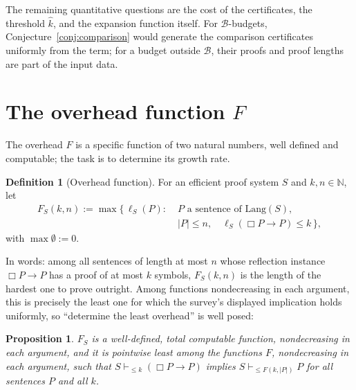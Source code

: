 \documentclass[11pt]{amsart}
\theoremstyle{plain}
\newtheorem{proposition}[theorem]{Proposition}
\theoremstyle{definition}
\newtheorem{definition}[theorem]{Definition}
\newcommand{\Lang}{\mathrm{Lang}}
\newcommand{\Bud}{\mathcal{B}}
\begin{document}
The remaining quantitative questions are the cost of the certificates, the threshold $\hat k$, and the expansion function itself. For $\Bud$-budgets, Conjecture~\ref{conj:comparison} would generate the comparison certificates uniformly from the term; for a budget outside $\Bud$, their proofs and proof lengths are part of the input data.

\section{The overhead function \texorpdfstring{$F$}{F}}
\label{sec:overhead}

The overhead $F$ is a specific function of two natural numbers, well defined and computable; the task is to determine its growth rate.

\begin{definition}[Overhead function]
\label{def:F}
For an efficient proof system $S$ and $k, n \in \mathbb{N}$, let
\[
\begin{aligned}
F_S(k,n):=\max\bigl\{\,\ell_S(P):\;&P\text{ a sentence of }\Lang(S),\\
&|P|\le n,\quad \ell_S(\Box P\to P)\le k\,\bigr\},
\end{aligned}
\]
with $\max \emptyset := 0$.
\end{definition}

In words: among all sentences of length at most $n$ whose reflection instance $\Box P \to P$ has a proof of at most $k$ symbols, $F_S(k,n)$ is the length of the hardest one to prove outright. Among functions nondecreasing in each argument, this is precisely the least one for which the survey's displayed implication holds uniformly, so ``determine the least overhead'' is well posed:

\begin{proposition}
\label{prop:welldefined}
$F_S$ is a well-defined, total computable function, nondecreasing in each argument, and it is pointwise least among the functions $F$, nondecreasing in each argument, such that $S \vdash_{\le k} (\Box P \to P)$ implies $S \vdash_{\le F(k,|P|)} P$ for all sentences $P$ and all $k$.
\end{proposition}
\end{document}
